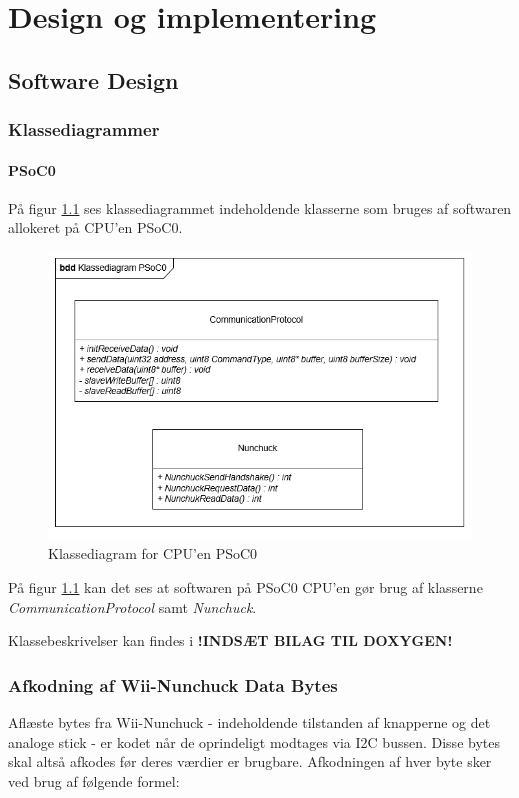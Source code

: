 \chapter{Design og implementering}


\section{Software Design}

\subsection{Klassediagrammer}

\subsubsection{PSoC0}
På figur \ref{figure:PSoC0KlasseDiagram} ses klassediagrammet indeholdende klasserne som bruges af softwaren allokeret på CPU'en PSoC0.

\begin{figure}[H]
	\centering
	\includegraphics[width=\textwidth]{DesignOgImplementering/images/PSoC0KlasseDiagram}
	\caption{Klassediagram for CPU'en PSoC0}
	\label{figure:PSoC0KlasseDiagram}
\end{figure}

På figur \ref{figure:PSoC0KlasseDiagram} kan det ses at softwaren på PSoC0 CPU'en gør brug af klasserne \textit{CommunicationProtocol} samt \textit{Nunchuck}.

Klassebeskrivelser kan findes i \textbf{!INDSÆT BILAG TIL DOXYGEN!}

\subsection{Afkodning af Wii-Nunchuck Data Bytes}
Aflæste bytes fra Wii-Nunchuck - indeholdende tilstanden af knapperne og det analoge stick - er kodet når de oprindeligt modtages via I2C bussen. Disse bytes skal altså afkodes før deres værdier er brugbare. Afkodningen af hver byte sker ved brug af følgende formel:

